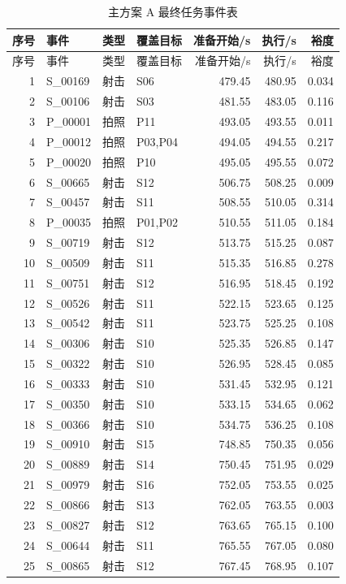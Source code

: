 \documentclass{cumcmthesis}
\begin{document}
\begin{longtable}{rlllrrr}
  \caption{主方案 A 最终任务事件表}\label{tab:final_events}\\
  \toprule
  序号 & 事件 & 类型 & 覆盖目标 & 准备开始/s & 执行/s & 裕度\\
  \midrule
  \endfirsthead
  \toprule
  序号 & 事件 & 类型 & 覆盖目标 & 准备开始/s & 执行/s & 裕度\\
  \midrule
  \endhead
  1 & S\_00169 & 射击 & S06 & 479.45 & 480.95 & 0.034\\
  2 & S\_00106 & 射击 & S03 & 481.55 & 483.05 & 0.116\\
  3 & P\_00001 & 拍照 & P11 & 493.05 & 493.55 & 0.011\\
  4 & P\_00012 & 拍照 & P03,P04 & 494.05 & 494.55 & 0.217\\
  5 & P\_00020 & 拍照 & P10 & 495.05 & 495.55 & 0.072\\
  6 & S\_00665 & 射击 & S12 & 506.75 & 508.25 & 0.009\\
  7 & S\_00457 & 射击 & S11 & 508.55 & 510.05 & 0.314\\
  8 & P\_00035 & 拍照 & P01,P02 & 510.55 & 511.05 & 0.184\\
  9 & S\_00719 & 射击 & S12 & 513.75 & 515.25 & 0.087\\
  10 & S\_00509 & 射击 & S11 & 515.35 & 516.85 & 0.278\\
  11 & S\_00751 & 射击 & S12 & 516.95 & 518.45 & 0.192\\
  12 & S\_00526 & 射击 & S11 & 522.15 & 523.65 & 0.125\\
  13 & S\_00542 & 射击 & S11 & 523.75 & 525.25 & 0.108\\
  14 & S\_00306 & 射击 & S10 & 525.35 & 526.85 & 0.147\\
  15 & S\_00322 & 射击 & S10 & 526.95 & 528.45 & 0.085\\
  16 & S\_00333 & 射击 & S10 & 531.45 & 532.95 & 0.121\\
  17 & S\_00350 & 射击 & S10 & 533.15 & 534.65 & 0.062\\
  18 & S\_00366 & 射击 & S10 & 534.75 & 536.25 & 0.108\\
  19 & S\_00910 & 射击 & S15 & 748.85 & 750.35 & 0.056\\
  20 & S\_00889 & 射击 & S14 & 750.45 & 751.95 & 0.029\\
  21 & S\_00979 & 射击 & S16 & 752.05 & 753.55 & 0.025\\
  22 & S\_00866 & 射击 & S13 & 762.05 & 763.55 & 0.003\\
  23 & S\_00827 & 射击 & S12 & 763.65 & 765.15 & 0.100\\
  24 & S\_00644 & 射击 & S11 & 765.55 & 767.05 & 0.080\\
  25 & S\_00865 & 射击 & S12 & 767.45 & 768.95 & 0.107\\
  \bottomrule
\end{longtable}
\end{document}
